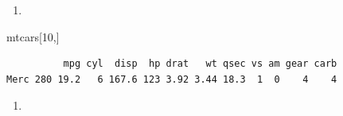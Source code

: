 \documentclass[
  letterpaper,
  DIV=11,
  numbers=noendperiod]{scrreprt}
\newenvironment{Shaded}{\begin{snugshade}}{\end{snugshade}}
\newcommand{\CommentTok}[1]{\textcolor[rgb]{0.37,0.37,0.37}{#1}}
\newcommand{\DecValTok}[1]{\textcolor[rgb]{0.68,0.00,0.00}{#1}}
\newcommand{\FunctionTok}[1]{\textcolor[rgb]{0.28,0.35,0.67}{#1}}
\newcommand{\NormalTok}[1]{\textcolor[rgb]{0.00,0.23,0.31}{#1}}
\newcommand{\SpecialCharTok}[1]{\textcolor[rgb]{0.37,0.37,0.37}{#1}}
\providecommand{\tightlist}{%
  \setlength{\itemsep}{0pt}\setlength{\parskip}{0pt}}\usepackage{longtable,booktabs,array}
\begin{document}
\begin{enumerate}
\def\labelenumi{\alph{enumi})}
\setcounter{enumi}{6}
\tightlist
\item
\end{enumerate}

\begin{Shaded}
\begin{Highlighting}[]
\NormalTok{mtcars[}\DecValTok{10}\NormalTok{,]}
\end{Highlighting}
\end{Shaded}

\begin{verbatim}
          mpg cyl  disp  hp drat   wt qsec vs am gear carb
Merc 280 19.2   6 167.6 123 3.92 3.44 18.3  1  0    4    4
\end{verbatim}

\begin{enumerate}
\def\labelenumi{\alph{enumi})}
\setcounter{enumi}{7}
\tightlist
\item
\end{enumerate}

\begin{Shaded}
\end{Shaded}
\end{document}
